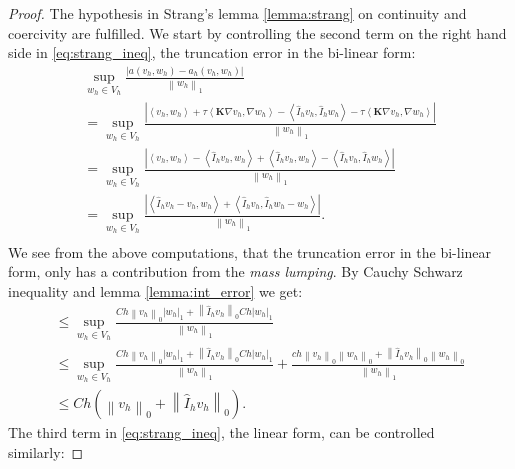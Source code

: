 \documentclass[../Main/main.tex]{subfiles}
\begin{document}
	\begin{proof}
		The hypothesis in Strang's lemma \ref{lemma:strang} on continuity and coercivity are fulfilled.
		We start by controlling the second term on the right hand side in \eqref{eq:strang_ineq}, the truncation error in the bi-linear form:
		\begin{equation}
			\begin{gathered}
				\sup_{w_h\in V_h} \frac{|a(v_h,w_h)-a_h(v_h,w_h)|}{\left \|w_h \right \|_1} \\
				=\sup_{w_h\in V_h} \frac{|\left \langle v_h,w_h\right \rangle + \tau \left \langle\bm{K} \nabla v_h,\nabla w_h \right \rangle - \left \langle \hat{I}_h v_h, \hat{I}_h w_h \right \rangle - \tau \left \langle\bm{K} \nabla v_h, \nabla w_h \right \rangle|}{\left \| w_h \right \|_1} \\
				=\sup_{w_h\in V_h} \frac{|\left \langle v_h,w_h\right \rangle - \left \langle \hat{I}_h v_h, w_h \right \rangle + \left \langle \hat{I}_h v_h, w_h \right \rangle - \left \langle \hat{I}_h v_h, \hat{I}_h w_h \right \rangle|}{\left \| w_h \right \|_1}\\
				= \sup_{w_h\in V_h}\frac{|\left \langle \hat{I}_h v_h - v_h,w_h \right \rangle + \left \langle \hat{I}_h v_h, \hat{I}_h w_h - w_h \right \rangle |}{\left \| w_h \right \|_1}. \\
			\end{gathered}
		\end{equation}
		We see from the above computations, that the truncation error in the bi-linear form, only has a contribution from the \emph{mass lumping}.
		By Cauchy Schwarz inequality and lemma \ref{lemma:int_error} we get:
		\begin{equation}
			\begin{gathered}
				\leq \sup_{w_h\in V_h}\frac{Ch\left \| v_h \right \|_0 | w_h|_1 + \left \|\hat{I}_h v_h\right \|_0 Ch|w_h|_1}{\left \| w_h \right \|_1}\\
				\leq 				 \sup_{w_h\in V_h}\frac{Ch\left \| v_h \right \|_0 | w_h|_1 + \left \|\hat{I}_h v_h\right \|_0 Ch|w_h|_1}{\left \| w_h \right \|_1} + \frac{ch\left \| v_h \right \|_0 \left \| w_h \right \|_0 + \left \|\hat{I}_h v_h\right \|_0 \left \| w_h \right \|_0}{\left \| w_h \right \|_1}\\
				\leq Ch \left (\left \| v_h \right \|_0 + \left \| \hat{I}_h v_h \right \|_0 \right ).
			\end{gathered}
		\end{equation}
		The third term in \eqref{eq:strang_ineq}, the linear form, can be controlled similarly:

\end{proof}
\end{document}
